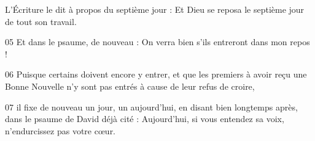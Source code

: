 
L’Écriture le dit à propos du septième jour : Et Dieu se reposa le septième jour de tout son travail.

05 Et dans le psaume, de nouveau : On verra bien s’ils entreront dans mon repos !

06 Puisque certains doivent encore y entrer, et que les premiers à avoir reçu une Bonne Nouvelle n’y sont pas entrés à cause de leur refus de croire,

07 il fixe de nouveau un jour, un aujourd’hui, en disant bien longtemps après, dans le psaume de David déjà cité : Aujourd’hui, si vous entendez sa voix, n’endurcissez pas votre cœur.
